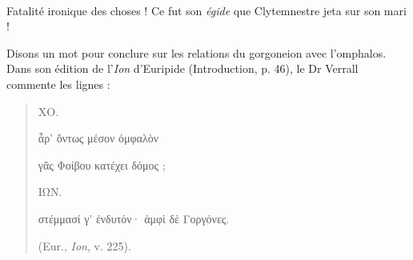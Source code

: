 \documentclass[a4paper, 11pt, oneside, polutonikogreek, french]{article}
\begin{document}
\paragraph{}
Fatalité ironique des choses ! Ce fut son \emph{égide} que Clytemnestre jeta sur son mari !

Disons un mot pour conclure sur les relations du gorgoneion avec l'omphalos. Dans son édition de l'\emph{Ion} d'Euripide (Introduction, p. 46), le Dr Verrall commente les lignes :
\begin{quotation}
ΧΟ.

ἆρ' ὄντως μέσον ὀμφαλὸν

γᾶς Φοίβου κατέχει δόμος ;

\bigskip

ΙΩΝ.

στέμμασί γ' ἐνδυτόν· ἀμφὶ δὲ Γοργόνες.

(Eur., \emph{Ion}, v. 225).
\end{quotation}
\end{document}
